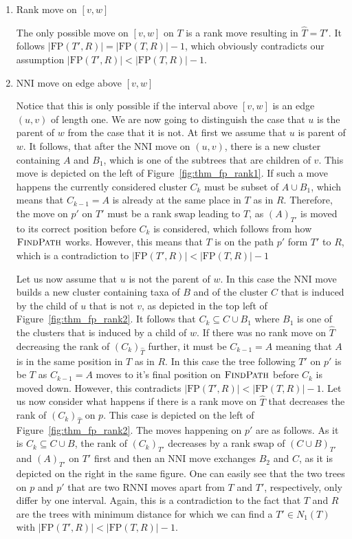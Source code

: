 \documentclass{amsart}
\newcommand{\rnni}{\mathrm{RNNI}}
\newcommand{\findpath}{\textsc{FindPath}}
\newcommand{\nni}{\mathrm{NNI}}
\newcommand{\fp}{\mathrm{FP}}
\begin{document}
\begin{enumerate}
\item Rank move on $[v,w]$

The only possible move on $[v,w]$ on $T$ is a rank move resulting in $\hat T = T'$.
It follows $|\fp(T',R)| = |\fp(T,R)| - 1$, which obviously contradicts our assumption $|\fp(T',R)| < |\fp(T,R)| - 1$.

\item $\nni$ move on edge above $[v,w]$

Notice that this is only possible if the interval above $[v,w]$ is an edge $(u,v)$ of length one.
We are now going to distinguish the case that $u$ is the parent of $w$ from the case that it is not.
At first we assume that $u$ is parent of $w$.
It follows, that after the $\nni$ move on $(u,v)$, there is a new cluster containing $A$ and $B_1$, which is one of the subtrees that are children of $v$.
This move is depicted on the left of Figure~\ref{fig:thm_fp_rank1}.
If such a move happens the currently considered cluster $C_k$ must be subset of $A \cup B_1$, which means that $C_{k-1} = A$ is already at the same place in $T$ as in $R$.
Therefore, the move on $p'$ on $T'$ must be a rank swap leading to $T$, as $(A)_{T'}$ is moved to its correct position before $C_k$ is considered, which follows from how $\findpath$ works.
However, this means that $T$ is on the path $p'$ form $T'$ to $R$, which is a contradiction to $|\fp(T',R)| < |\fp(T,R)| - 1$

Let us now assume that $u$ is not the parent of $w$.
In this case the $\nni$ move builds a new cluster containing taxa of $B$ and of the cluster $C$ that is induced by the child of $u$ that is not $v$, as depicted in the top left of Figure~\ref{fig:thm_fp_rank2}.
It follows that $C_k \subseteq C \cup B_1$ where $B_1$ is one of the clusters that is induced by a child of $w$.
If there was no rank move on $\hat T$ decreasing the rank of $(C_k)_{\hat T}$ further, it must be $C_{k-1} = A$ meaning that $A$ is in the same position in $T$ as in $R$.
In this case the tree following $T'$ on $p'$ is be $T$ as $C_{k-1} = A$ moves to it's final position on $\findpath$ before $C_k$ is moved down.
However, this contradicts $|\fp(T',R)| < |\fp(T,R)| - 1$.
Let us now consider what happens if there is a rank move on $\hat T$ that decreases the rank of $(C_k)_{\hat T}$ on $p$.
This case is depicted on the left of Figure~\ref{fig:thm_fp_rank2}.
The moves happening on $p'$ are as follows.
As it is $C_k \subseteq C \cup B$, the rank of $(C_k)_{T'}$ decreases by a rank swap of $(C \cup B)_{T'}$ and $(A)_{T'}$ on $T'$ first and then an $\nni$ move exchanges $B_2$ and $C$, as it is depicted on the right in the same figure.
One can easily see that the two trees on $p$ and $p'$ that are two $\rnni$ moves apart from $T$ and $T'$, respectively, only differ by one interval.
Again, this is a contradiction to the fact that $T$ and $R$ are the trees with minimum distance for which we can find a $T' \in N_1(T)$ with $|\fp(T',R)| < |\fp(T,R)| - 1$.


\end{enumerate}
\end{document}

